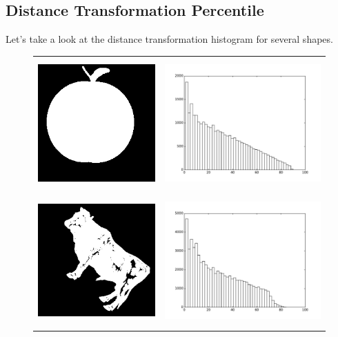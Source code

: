 \documentclass[a4paper, 11pt]{article}
\begin{document}
\subsection{Distance Transformation Percentile}
Let's take a look at the distance transformation histogram for several shapes.
\begin{figure}[h!]
\centering
\begin{tabular}{ll}
\includegraphics[width=5cm]{apple.png} &
\includegraphics[height=5cm]{apple-dthist.pdf} \\
\includegraphics[width=5cm]{cattle.png} &
\includegraphics[height=5cm]{cattle-dthist.pdf} \\

\end{tabular}
\end{figure}
\end{document}
